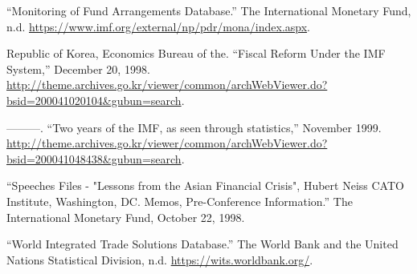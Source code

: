 \begin{CSLReferences}{1}{0}
\leavevmode{}%
{``Monitoring of {Fund Arrangements Database}.''} {The International
Monetary Fund}, n.d.
\url{https://www.imf.org/external/np/pdr/mona/index.aspx}.

\leavevmode{}%
Republic of Korea, Economics Bureau of the. {``Fiscal Reform Under the
{IMF} System,''} December 20, 1998.
\url{http://theme.archives.go.kr/viewer/common/archWebViewer.do?bsid=200041020104\&gubun=search}.

\leavevmode{}%
---------. {``Two years of the IMF, as seen through statistics,''}
November 1999.
\url{http://theme.archives.go.kr/viewer/common/archWebViewer.do?bsid=200041048438\&gubun=search}.

\leavevmode{}%
{``Speeches Files - "{Lessons} from the {Asian Financial Crisis}",
{Hubert Neiss CATO Institute}, {Washington}, {DC}. {Memos},
Pre-Conference Information.''} {The International Monetary Fund},
October 22, 1998.

\leavevmode{}%
{``World {Integrated Trade Solutions Database}.''} {The World Bank and
the United Nations Statistical Division}, n.d.
\url{https://wits.worldbank.org/}.

\end{CSLReferences}
